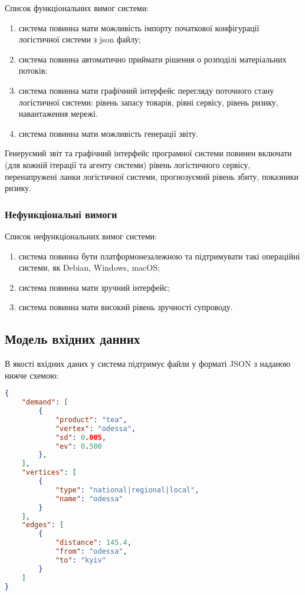 Список функціональних вимог системи:
\begin{enumerate}[label={\arabic*)}]
	\item система повинна мати можливість імпорту початкової конфігурації логістичної системи з \acrshort{json} файлу;
	\item система повинна автоматично приймати рішення о розподілі матеріальних потоків;
	\item система повинна мати графічний інтерфейс перегляду поточного стану логістичної системи: рівень запасу товарів, рівні сервісу, рівень ризику, навантаження мережі. 
	\item система повинна мати можливість генерації звіту.
\end{enumerate}

Генеруємий звіт та графічний інтерфейс програмної системи повинен включати (для кожній ітерації та агенту системи) рівень логістичного сервісу, перенапружені ланки логістичної системи, прогнозуємий рівень збиту, показники ризику.

\subsubsection{Нефункціональні вимоги}
Список нефункціональних вимог системи:
\begin{enumerate}[label={\arabic*)}]
	\item система повинна бути платформонезалежною та підтримувати такі операційні системи, як Debian, Windows, macOS;
	\item система повинна мати зручний інтерфейс;
	\item система повинна мати високий рівень зручності супроводу.
\end{enumerate}

\subsection{Модель вхідних данних}
В якості вхідних даних у система підтримує файли у форматі JSON з наданою нижче схемою: 

{\small
\begin{lstlisting}[language=json,firstnumber=1]
{
	"demand": [
		{
			"product": "tea",
			"vertex": "odessa",
			"sd": 0.005,
			"ev": 0.500
		},
	],
	"vertices": [
		{
			"type": "national|regional|local",
			"name": "odessa"
		}
	],
	"edges": [
		{
			"distance": 145.4,
			"from": "odessa",
			"to": "kyiv"
		}
	]
}
\end{lstlisting}
}

